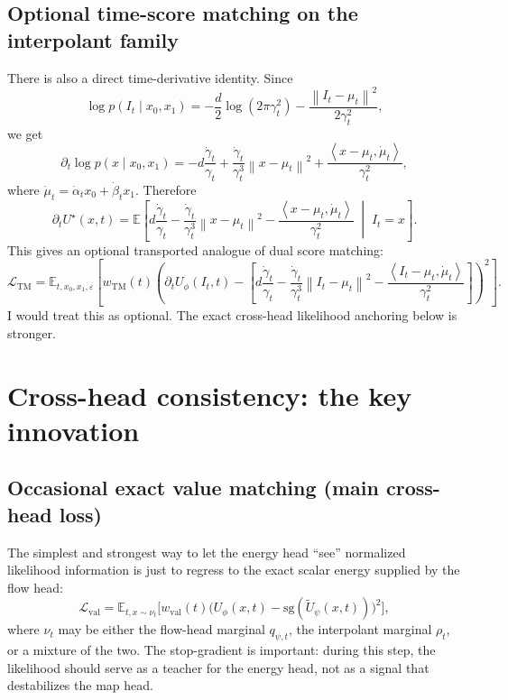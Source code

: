 \documentclass[11pt]{article}
\newcommand{\E}{\mathbb{E}}
\newcommand{\sg}{\mathrm{sg}}
\newcommand{\norm}[1]{\left\lVert #1 \right\rVert}
\newcommand{\inner}[2]{\left\langle #1, #2 \right\rangle}
\newcommand{\energy}{U_{\phi}}
\begin{document}
\subsection{Optional time-score matching on the interpolant family}

There is also a direct time-derivative identity. Since
\begin{equation}
\log p(I_t\mid x_0,x_1)
=
-\frac{d}{2}\log(2\pi\gamma_t^2)
-
\frac{\norm{I_t-\mu_t}^2}{2\gamma_t^2},
\label{eq:conditional_log_gauss}
\end{equation}
we get
\begin{equation}
\partial_t \log p(x\mid x_0,x_1)
=
-d\frac{\dot\gamma_t}{\gamma_t}
+
\frac{\dot\gamma_t}{\gamma_t^3}\norm{x-\mu_t}^2
+
\frac{\inner{x-\mu_t}{\dot\mu_t}}{\gamma_t^2},
\label{eq:conditional_time_derivative}
\end{equation}
where $\dot\mu_t = \dot\alpha_t x_0 + \dot\beta_t x_1$. Therefore
\begin{equation}
\partial_t U^{\star}(x,t)
=
\E\left[
 d\frac{\dot\gamma_t}{\gamma_t}
-
\frac{\dot\gamma_t}{\gamma_t^3}\norm{x-\mu_t}^2
-
\frac{\inner{x-\mu_t}{\dot\mu_t}}{\gamma_t^2}
\;\middle|\; I_t=x
\right].
\label{eq:time_identity}
\end{equation}
This gives an optional transported analogue of dual score matching:
\begin{equation}
\mathcal{L}_{\mathrm{TM}}
=
\E_{t,x_0,x_1,\varepsilon}
\left[
 w_{\mathrm{TM}}(t)
\left(
\partial_t \energy(I_t,t)
-
\left[
 d\frac{\dot\gamma_t}{\gamma_t}
-
\frac{\dot\gamma_t}{\gamma_t^3}\norm{I_t-\mu_t}^2
-
\frac{\inner{I_t-\mu_t}{\dot\mu_t}}{\gamma_t^2}
\right]
\right)^2
\right].
\label{eq:L_TM}
\end{equation}
I would treat this as optional. The exact cross-head likelihood anchoring below is stronger.

\section{Cross-head consistency: the key innovation}

\subsection{Occasional exact value matching (main cross-head loss)}

The simplest and strongest way to let the energy head ``see'' normalized likelihood information is just to regress to the exact scalar energy supplied by the flow head:
\begin{equation}
\mathcal{L}_{\mathrm{val}}
=
\E_{t,x \sim \nu_t}
\Big[
 w_{\mathrm{val}}(t)
\big(
\energy(x,t) - \sg(\widetilde U_{\psi}(x,t))
\big)^2
\Big],
\label{eq:L_val}
\end{equation}
where $\nu_t$ may be either the flow-head marginal $q_{\psi,t}$, the interpolant marginal $\rho_t$, or a mixture of the two. The stop-gradient is important: during this step, the likelihood should serve as a teacher for the energy head, not as a signal that destabilizes the map head.
\end{document}
